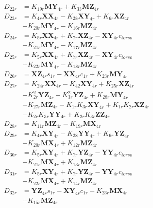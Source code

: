 \begin{align}
 \nonumber \\ 
D_{22r} &= K_{19r}\mathbf{MY}_{4r} + K_{33}\mathbf{MZ}_{4r} \nonumber \\
D_{23r} &= K_{4r}\mathbf{XX}_{4r} - K_{28}\mathbf{XY}_{4r} + K_{6r}\mathbf{XZ}_{4r}  \nonumber \\
&+ K_{20r}\mathbf{MY}_{4r} - K_{16r}\mathbf{MZ}_{4r} \nonumber \\
D_{24r} &= K_{5r}\mathbf{XX}_{4r} + K_{7r}\mathbf{XZ}_{4r} - \mathbf{XY}_{4r}c_{torso}  \nonumber \\
&+ K_{21r}\mathbf{MY}_{4r} - K_{17r}\mathbf{MZ}_{4r} \nonumber \\
D_{25r} &= K_{5r}\mathbf{XX}_{4r} + K_{7r}\mathbf{XZ}_{4r} - \mathbf{XY}_{4r}c_{torso}  \nonumber \\
&+ K_{22r}\mathbf{MY}_{4r} - K_{18r}\mathbf{MZ}_{4r} \nonumber \\
D_{26r} &= \mathbf{XZ}_{4r}s_{1r} - \mathbf{XX}_{4r}c_{1r} + K_{23r}\mathbf{MY}_{4r} \nonumber \\
D_{27r} &= K_{24r}\mathbf{XX}_{4r} - K_{42}\mathbf{XY}_{4r} + K_{25r}\mathbf{XZ}_{4r}  \nonumber \\
&+ K_{2r}^2\mathbf{YZ}_{4r} - K_{3r}^2\mathbf{YZ}_{4r} + K_{28r}\mathbf{MY}_{4r}  \nonumber \\
&- K_{27r}\mathbf{MZ}_{4r} - K_{1r}K_{3r}\mathbf{XY}_{4r} + K_{1r}K_{2r}\mathbf{XZ}_{4r}  \nonumber \\
&- K_{2r}K_{3r}\mathbf{YY}_{4r} + K_{2r}K_{3r}\mathbf{ZZ}_{4r} \nonumber \\
D_{28r} &= K_{11r}\mathbf{MZ}_{4r} - K_{19r}\mathbf{MX}_{4r} \nonumber \\
D_{29r} &= K_{4r}\mathbf{XY}_{4r} - K_{28}\mathbf{YY}_{4r} + K_{6r}\mathbf{YZ}_{4r}  \nonumber \\
&- K_{20r}\mathbf{MX}_{4r} + K_{12r}\mathbf{MZ}_{4r} \nonumber \\
D_{30r} &= K_{5r}\mathbf{XY}_{4r} + K_{7r}\mathbf{YZ}_{4r} - \mathbf{YY}_{4r}c_{torso}  \nonumber \\
&- K_{21r}\mathbf{MX}_{4r} + K_{13r}\mathbf{MZ}_{4r} \nonumber \\
D_{31r} &= K_{5r}\mathbf{XY}_{4r} + K_{7r}\mathbf{YZ}_{4r} - \mathbf{YY}_{4r}c_{torso}  \nonumber \\
&- K_{22r}\mathbf{MX}_{4r} + K_{14r}\mathbf{MZ}_{4r} \nonumber \\
D_{32r} &= \mathbf{YZ}_{4r}s_{1r} - \mathbf{XY}_{4r}c_{1r} - K_{23r}\mathbf{MX}_{4r}  \nonumber \\
&+ K_{15r}\mathbf{MZ}_{4r} \nonumber \\

\end{align}
